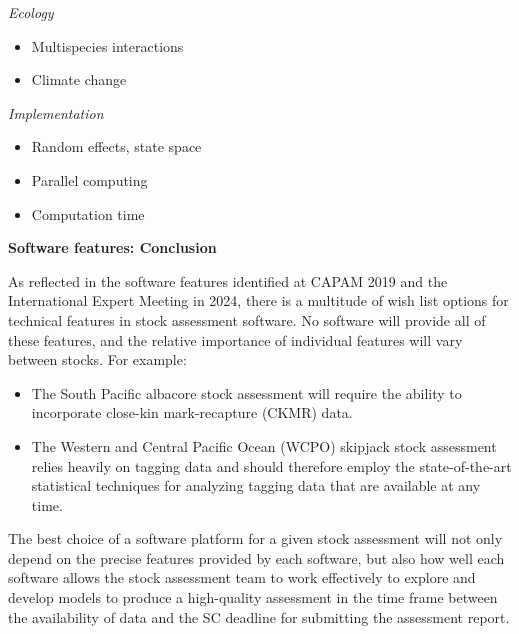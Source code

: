 \documentclass{SCreport}
\begin{document}
\vspace{1ex}

\textit{Ecology}

\begin{itemize}
  \item Multispecies interactions\\[-4.5ex]
  \item Climate change
\end{itemize}

\vspace{1ex}

\textit{Implementation}

\begin{itemize}
  \item Random effects, state space\\[-4.5ex]
  \item Parallel computing\\[-4.5ex]
  \item Computation time
\end{itemize}

\newpage

\textbf{Software features: Conclusion}

As reflected in the software features identified at CAPAM 2019 and the
International Expert Meeting in 2024, there is a multitude of wish list options
for technical features in stock assessment software. No software will provide
all of these features, and the relative importance of individual features will
vary between stocks. For example:

\begin{itemize}
  \item The South Pacific albacore stock assessment will require the ability to
  incorporate close-kin mark-recapture (CKMR) data.
  \item The Western and Central Pacific Ocean (WCPO) skipjack stock assessment
  relies heavily on tagging data and should therefore employ the
  state-of-the-art statistical techniques for analyzing tagging data that are
  available at any time.
\end{itemize}

The best choice of a software platform for a given stock assessment will not
only depend on the precise features provided by each software, but also how well
each software allows the stock assessment team to work effectively to explore
and develop models to produce a high-quality assessment in the time frame
between the availability of data and the SC deadline for submitting the
assessment report.
\end{document}
